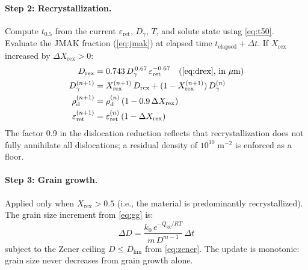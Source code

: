 \documentclass[11pt,a4paper]{article}
\newcommand{\DG}{\ensuremath{D_\gamma}}
\newcommand{\Xrex}{\ensuremath{X_\mathrm{rex}}}
\newcommand{\epsr}{\ensuremath{\varepsilon_\mathrm{ret}}}
\newcommand{\rhod}{\ensuremath{\rho_\mathrm{d}}}
\begin{document}
\paragraph{Step 2: Recrystallization.}
Compute $t_{0.5}$ from the current $\epsr$, $\DG$, $T$, and solute state
using \cref{eq:t50}.  Evaluate the JMAK fraction (\cref{eq:jmak}) at elapsed
time $t_\mathrm{elapsed} + \Delta t$.  If $\Xrex$ increased by
$\Delta \Xrex > 0$:
\begin{align}
  D_\mathrm{rex} &= 0.743\,D_\gamma^{\,0.67}\,\varepsilon_\mathrm{ret}^{-0.67}
    \quad\text{(\cref{eq:drex}, in $\mu$m)} \\
  \DG^{(n+1)} &= \Xrex^{(n+1)}\,D_\mathrm{rex}
    + (1 - \Xrex^{(n+1)})\,\DG^{(n)} \\
  \rhod^{(n+1)} &= \rhod^{(n)}\,(1 - 0.9\,\Delta\Xrex) \\
  \epsr^{(n+1)} &= \epsr^{(n)}\,(1 - \Delta\Xrex)
\end{align}
The factor 0.9 in the dislocation reduction reflects that recrystallization
does not fully annihilate all dislocations; a residual density of
$10^{10}\;\mathrm{m}^{-2}$ is enforced as a floor.

\paragraph{Step 3: Grain growth.}
Applied only when $\Xrex > 0.5$ (i.e., the material is predominantly
recrystallized).  The grain size increment from \cref{eq:gg} is:
\begin{equation}
  \Delta D = \frac{k_0\,e^{-Q_\mathrm{gg}/RT}}{m\,D^{m-1}}\,\Delta t
\end{equation}
subject to the Zener ceiling $D \le D_\mathrm{lim}$ from \cref{eq:zener}.
The update is monotonic: grain size never decreases from grain growth alone.
\end{document}
